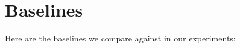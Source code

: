 \documentclass{article}
\theoremstyle{plain}
\theoremstyle{definition}
\theoremstyle{remark}
\begin{document}


\section{Baselines}
\label{appendix:baselines}

Here are the baselines we compare against in our experiments:
\end{document}
